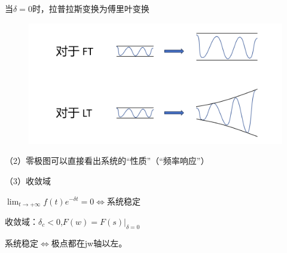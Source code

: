 \documentclass[UTF8]{ctexart}
\begin{document}
当$\delta=0$时，拉普拉斯变换为傅里叶变换 \par
\begin{figure}[h]
    \centering         %
    \includegraphics[scale=0.45]{3.png}
\end{figure}
（2）零极图可以直接看出系统的“性质”（“频率响应”）\par
（3）收敛域\par
$\lim_{t \to +\infty}f(t)e^{-\delta t}=0\Longleftrightarrow   $系统稳定\par
收敛域：$\delta_c<0$,$F(w)=F(s)\vert _{\delta=0}$\par
系统稳定$\Longleftrightarrow $极点都在jw轴以左。\par
\end{document}
